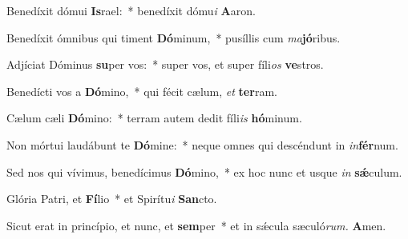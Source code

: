 \item Benedíxit dómui \textbf{Is}rael:~* benedíxit dómu\textit{i} \textbf{A}aron.
\item  Benedíxit ómnibus qui timent \textbf{Dó}minum,~* pusíllis cum \textit{ma}\textbf{jó}ribus.
\item Adjíciat Dóminus \textbf{su}per vos:~* super vos, et super fíli\textit{os} \textbf{ve}stros.
\item Benedícti vos a \textbf{Dó}mino,~* qui fécit cælum, \textit{et} \textbf{ter}ram.
\item Cælum cæli \textbf{Dó}mino:~* terram autem dedit fíli\textit{is} \textbf{hó}minum.
\item Non mórtui laudábunt te \textbf{Dó}mine:~* neque omnes qui descéndunt in \textit{in}\textbf{fér}num.
\item Sed nos qui vívimus, benedícimus \textbf{Dó}mino,~* ex hoc nunc et usque \textit{in} \textbf{sǽ}culum.
\item Glória Patri, et \textbf{Fí}lio~* et Spirítu\textit{i} \textbf{San}cto.
\item Sicut erat in princípio, et nunc, et \textbf{sem}per~* et in sǽcula sæculó\textit{rum.} \textbf{A}men.
